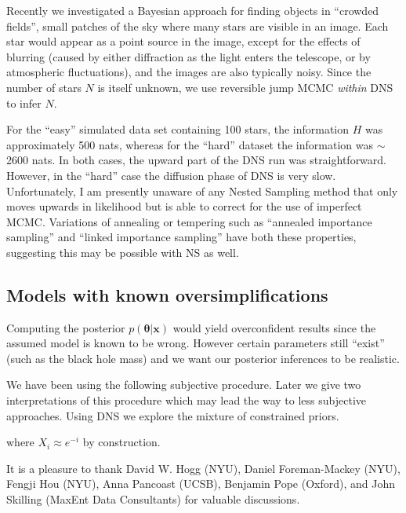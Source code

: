 \documentclass[
  ,final            %
  ]
  {aipproc}
\newcommand{\pars}{\boldsymbol{\theta}}
\newcommand{\data}{\mathbf{x}}
\begin{document}
Recently we investigated a Bayesian approach for finding objects in ``crowded
fields'', small patches of the sky where many stars are visible in an image.
Each star would appear as a point source in the image, except for the effects
of blurring (caused by either diffraction as the light enters the telescope,
or by atmospheric fluctuations), and the images are also typically noisy.
Since the number of stars $N$ is itself unknown, we use reversible jump
MCMC {\it within} DNS to infer $N$.

For the ``easy'' simulated data set containing 100 stars, the information
$H$ was approximately 500 nats, whereas for the ``hard'' dataset the information
was $\sim$2600 nats. In both cases, the upward part of the DNS run was
straightforward. However, in the ``hard'' case the diffusion phase of DNS
is very slow. Unfortunately, I am presently unaware of any Nested Sampling
method that only moves upwards in likelihood but is able to correct for the
use of imperfect MCMC. Variations of annealing or tempering such as
``annealed importance sampling'' and ``linked importance sampling'' \citep{ais, lis}
have both these properties, suggesting this may be possible with NS as well.





\subsection{Models with known oversimplifications}
Computing the posterior $p(\pars | \data)$ would yield overconfident results
since the assumed model is known to be wrong. However certain parameters still
``exist'' (such as the black hole mass) and we want our posterior inferences
to be realistic.

We have been using the following subjective procedure. Later we give two
interpretations of this procedure which may lead the way to less subjective
approaches.
Using DNS we explore the mixture of constrained priors.

where $X_i \approx e^{-i}$ by construction.


\begin{theacknowledgments}
It is a pleasure to thank David W. Hogg (NYU), Daniel Foreman-Mackey (NYU),
Fengji Hou (NYU), Anna Pancoast (UCSB), Benjamin Pope (Oxford), and
John Skilling (MaxEnt Data Consultants) for valuable discussions.
\end{theacknowledgments}
\end{document}
